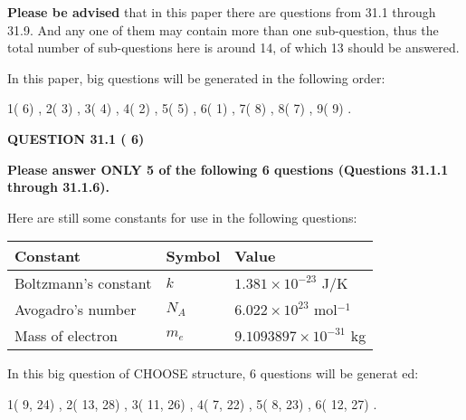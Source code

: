 \documentclass[12pt]{article}
\begin{document}
 
{\textbf{\large{Please be advised}}} that in this paper there are questions from
31.1 through
31.9.
And any one of them may contain more than one sub-question, thus the total number
of sub-questions here is around 14, of which
13 should be answered.
 
\vspace{0.3in}
 
 
   
   
   
\vspace{0.2in}
   
In this paper, big questions will be generated in the following order: 
   
   
            1(          6)
 ,
            2(          3)
 ,
            3(          4)
 ,
            4(          2)
 ,
            5(          5)
 ,
            6(          1)
 ,
            7(          8)
 ,
            8(          7)
 ,
            9(          9)
 .
  
\vspace{0.2in}
  
{\textbf{\Large{QUESTION
31.1 
 (          6)
}}}
  
  
 
{\textbf{\Large{Please answer ONLY
5 of the following
6 questions (Questions
31.1.1 through
31.1.6). }}}
 
Here are still some constants for use in the following questions:
 
 
\noindent\begin{tabular}{|l|l|l|}
\hline
Constant & Symbol & Value \\
\hline
 
Boltzmann's constant &
$k$ &
 $ 1.381 \times 10^{-23} $
J/K \\
\hline
 
Avogadro's number &
$N_A$ &
 $ 6.022 \times 10^{23} $
mol$^{-1}$ \\
\hline
 
Mass of electron &
$m_e$ &
 $ 9.1093897 \times 10^{-31} $
kg \\
\hline
 
\end{tabular}
 
   
\vspace{0.2in}
   
 In this big question of CHOOSE structure,           6 questions will be generat
 ed: 
  
  
            1(          9,         24)
 ,
            2(         13,         28)
 ,
            3(         11,         26)
 ,
            4(          7,         22)
 ,
            5(          8,         23)
 ,
            6(         12,         27)
 .
  
\end{document}
